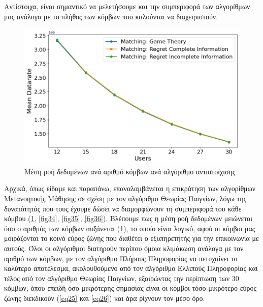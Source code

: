 Αντίστοιχα, είναι σημαντικό να μελετήσουμε και την συμπεριφορά των αλγορίθμων μας ανάλογα με το πλήθος των κόμβων που καλούνται να διαχειριστούν.

\begin{figure}[ht]
    \centering
    \includegraphics[width=\textwidth]{figures/chapter4/Mean_Datarate_vs_Users.png}
    \caption{Μέση ροή δεδομένων ανά αριθμό κόμβων ανά αλγόριθμο αντιστοίχισης}
    \label{fig33}
\end{figure}

Αρχικά, όπως είδαμε και παραπάνω, επαναλαμβάνεται η επικράτηση των αλγορίθμων Μετανοητικής Μάθησης σε σχέση με τον αλγόριθμο Θεωρίας Παιγνίων, λόγω της δυνατότητάς που τους έχουμε δώσει να διαμορφώνουν τη συμπεριφορά του κάθε κόμβου (\ref{fig33}, \ref{fig34}, \ref{fig35}, \ref{fig36}). Βλέπουμε πως η μέση ροή δεδομένων μειώνεται όσο ο αριθμός των κόμβων αυξάνεται (\ref{fig33}), το οποίο είναι λογικό, αφού οι κόμβοι μας μοιράζονται το κοινό εύρος ζώνης που διαθέτει ο εξυπηρετητής για την επικοινωνία με αυτούς. Όλοι οι αλγόριθμοι διατηρούν περίπου όμοια κλιμάκωση ανάλογα με τον αριθμό των κόμβων, με τον αλγόριθμο Πλήρους Πληροφορίας να πετυχαίνει το καλύτερο αποτέλεσμα, ακολουθούμενο από τον αλγόριθμο Ελλιπούς Πληροφορίας και τέλος από τον αλγόριθμο Θεωρίας Παιγνίων, εξαιρώντας την περίπτωση των 30 κόμβων, όπου επειδή όσο μικρότερης σημασίας είναι οι κόμβοι τόσο μικρότερο εύρος ζώνης διεκδικούν (\ref{eq25} και \ref{eq26}) και άρα ρίχνουν τον μέσο όρο. 

